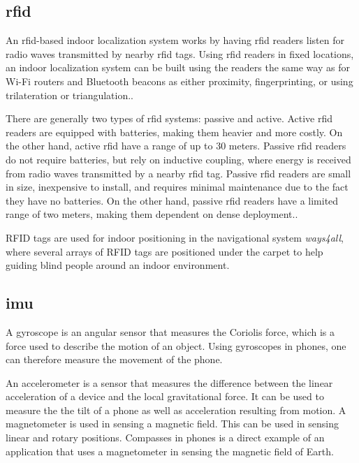 
\subsection{\gls{rfid}}
An \gls{rfid}-based indoor localization system works by having \gls{rfid} readers listen for radio waves transmitted by nearby \gls{rfid} tags. Using \gls{rfid} readers in fixed locations, an indoor localization system can be built using the readers the same way as for Wi-Fi routers and Bluetooth beacons as either proximity, fingerprinting, or using trilateration or triangulation.\cite{HabilitationThesis}.

There are generally two types of \gls{rfid} systems: passive and active. Active \gls{rfid} readers are equipped with batteries, making them heavier and more costly. On the other hand, active \gls{rfid} have a range of up to 30 meters. Passive \gls{rfid} readers do not require batteries, but rely on inductive coupling, where energy is received from radio waves transmitted by a nearby \gls{rfid} tag. Passive \gls{rfid} readers are small in size, inexpensive to install, and requires minimal maintenance due to the fact they have no batteries. On the other hand, passive \gls{rfid} readers have a limited range of two meters, making them dependent on dense deployment.\cite{HabilitationThesis}.

RFID tags are used for indoor positioning in the navigational system \textit{ways4all}, where several arrays of RFID tags are positioned under the carpet to help guiding blind people around an indoor environment\cite{HabilitationThesis}.

\subsection{\gls{imu}}
A gyroscope is an angular sensor that measures the Coriolis force, which is a force used to describe the motion of an object\cite{Gyroscope}. Using gyroscopes in phones, one can therefore measure the movement of the phone.

An accelerometer is a sensor that measures the difference between the linear acceleration of a device and the local gravitational force\cite{Accelerometer}. It can be used to measure the the tilt of a phone as well as acceleration resulting from motion\cite{Accelerometer2}.
A magnetometer is used in sensing a magnetic field. This can be used in sensing linear and rotary positions. Compasses in phones is a direct example of an application that uses a magnetometer in sensing the magnetic field of Earth.\cite{Magnetometer}

